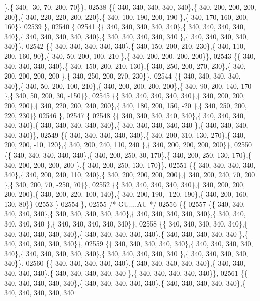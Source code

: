 \begin{DoxyCode}
      \},\{ 340, -30,  70, 200,  70\}\},
02538 \{\{ 340, 340, 340, 340, 340\},\{ 340, 200, 200, 200, 200\},\{ 340, 220, 220, 200, 220\},\{ 340, 100, 190, 200, 190
      \},\{ 340, 170, 160, 200, 160\}\}
02539 \},
02540 \{
02541 \{\{ 340, 340, 340, 340, 340\},\{ 340, 340, 340, 340, 340\},\{ 340, 340, 340, 340, 340\},\{ 340, 340, 340, 340, 340
      \},\{ 340, 340, 340, 340, 340\}\},
02542 \{\{ 340, 340, 340, 340, 340\},\{ 340, 150, 200, 210, 230\},\{ 340, 110, 200, 160,  90\},\{ 340,  50, 200, 100, 210
      \},\{ 340, 200, 200, 200, 200\}\},
02543 \{\{ 340, 340, 340, 340, 340\},\{ 340, 150, 200, 210, 130\},\{ 340, 250, 200, 270, 230\},\{ 340, 200, 200, 200, 200
      \},\{ 340, 250, 200, 270, 230\}\},
02544 \{\{ 340, 340, 340, 340, 340\},\{ 340,  50, 200, 100, 210\},\{ 340, 200, 200, 200, 200\},\{ 340,  90, 200, 140, 170
      \},\{ 340,  50, 200,  30, -150\}\},
02545 \{\{ 340, 340, 340, 340, 340\},\{ 340, 200, 200, 200, 200\},\{ 340, 220, 200, 240, 200\},\{ 340, 180, 200, 150, -20
      \},\{ 340, 250, 200, 220, 230\}\}
02546 \},
02547 \{
02548 \{\{ 340, 340, 340, 340, 340\},\{ 340, 340, 340, 340, 340\},\{ 340, 340, 340, 340, 340\},\{ 340, 340, 340, 340, 340
      \},\{ 340, 340, 340, 340, 340\}\},
02549 \{\{ 340, 340, 340, 340, 340\},\{ 340, 200, 310, 130, 270\},\{ 340, 200, 200, -10, 120\},\{ 340, 200, 240, 110, 240
      \},\{ 340, 200, 200, 200, 200\}\},
02550 \{\{ 340, 340, 340, 340, 340\},\{ 340, 200, 250,  30, 170\},\{ 340, 200, 250, 130, 170\},\{ 340, 200, 200, 200, 200
      \},\{ 340, 200, 250, 130, 170\}\},
02551 \{\{ 340, 340, 340, 340, 340\},\{ 340, 200, 240, 110, 240\},\{ 340, 200, 200, 200, 200\},\{ 340, 200, 240,  70, 200
      \},\{ 340, 200,  70, -250,  70\}\},
02552 \{\{ 340, 340, 340, 340, 340\},\{ 340, 200, 200, 200, 200\},\{ 340, 200, 220, 100, 140\},\{ 340, 200, 190, -120, 
      190\},\{ 340, 200, 160, 130,  80\}\}
02553 \}
02554 \},
02555 \textcolor{comment}{/* GU....AU */}
02556 \{\{
02557 \{\{ 340, 340, 340, 340, 340\},\{ 340, 340, 340, 340, 340\},\{ 340, 340, 340, 340, 340\},\{ 340, 340, 340, 340, 340
      \},\{ 340, 340, 340, 340, 340\}\},
02558 \{\{ 340, 340, 340, 340, 340\},\{ 340, 340, 340, 340, 340\},\{ 340, 340, 340, 340, 340\},\{ 340, 340, 340, 340, 340
      \},\{ 340, 340, 340, 340, 340\}\},
02559 \{\{ 340, 340, 340, 340, 340\},\{ 340, 340, 340, 340, 340\},\{ 340, 340, 340, 340, 340\},\{ 340, 340, 340, 340, 340
      \},\{ 340, 340, 340, 340, 340\}\},
02560 \{\{ 340, 340, 340, 340, 340\},\{ 340, 340, 340, 340, 340\},\{ 340, 340, 340, 340, 340\},\{ 340, 340, 340, 340, 340
      \},\{ 340, 340, 340, 340, 340\}\},
02561 \{\{ 340, 340, 340, 340, 340\},\{ 340, 340, 340, 340, 340\},\{ 340, 340, 340, 340, 340\},\{ 340, 340, 340, 340, 340

\end{DoxyCode}
